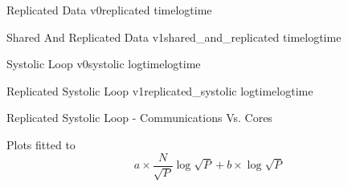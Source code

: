 \documentclass[xcolor={usenames, svgnames}]{beamer}
\begin{document}
\graphslides
    {Replicated Data}
    {v0}{replicated}
    {time}{logtime}

\graphslides
    {Shared And Replicated Data}
    {v1}{shared_and_replicated}
    {time}{logtime}

\graphslides
    {Systolic Loop}
    {v0}{systolic}
    {logtime}{logtime}

\graphslides
    {Replicated Systolic Loop}
    {v1}{replicated_systolic}
    {logtime}{logtime}

\begin{frame}{Replicated Systolic Loop - Communications Vs. Cores}
    \begin{center}
        \resizebox{0.7\textwidth}{!}{
            
        }
    \end{center}

    Plots fitted to
    \begin{equation*}
        a\times{}\frac{N}{\sqrt{P}}\log{\sqrt{P}} + b\times{}\log{\sqrt{P}}
    \end{equation*}
\end{frame}
\end{document}

